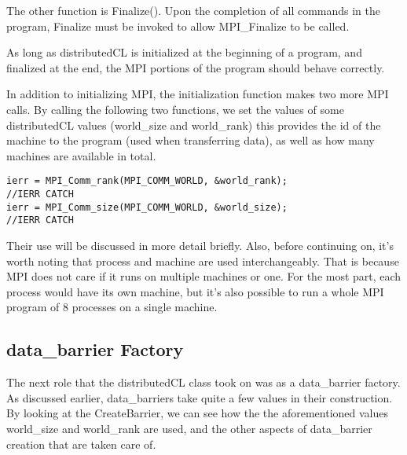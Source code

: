 \documentclass[../thesis.tex]{subfiles}
\begin{document}
    The other function is Finalize(). Upon the completion of all commands in the program, Finalize must be invoked to allow MPI\_Finalize to be called.

    As long as distributedCL is initialized at the beginning of a program, and finalized at the end, the MPI portions of the program should behave correctly.

    In addition to initializing MPI, the initialization function makes two more MPI calls. By calling the following two functions, we set the values of some distributedCL values (world\_size and world\_rank) this provides the id of the machine to the program (used when transferring data), as well as how many machines are available in total.

    \lstset{language=cpp}
    \begin{lstlisting}[tabsize=2]
ierr = MPI_Comm_rank(MPI_COMM_WORLD, &world_rank);
//IERR CATCH
ierr = MPI_Comm_size(MPI_COMM_WORLD, &world_size);
//IERR CATCH
    \end{lstlisting}

    Their use will be discussed in more detail briefly. Also, before continuing on, it's worth noting that process and machine are used interchangeably. That is because MPI does not care if it runs on multiple machines or one. For the most part, each process would have its own machine, but it's also possible to run a whole MPI program of 8 processes on a single machine.


\subsection{data\_barrier Factory} %
\label{sub:data_barrier_factory}
    The next role that the distributedCL class took on was as a data\_barrier factory. As discussed earlier, data\_barriers take quite a few values in their construction. By looking at the CreateBarrier, we can see how the the aforementioned values world\_size and world\_rank are used, and the other aspects of data\_barrier creation that are taken care of.
\end{document}
